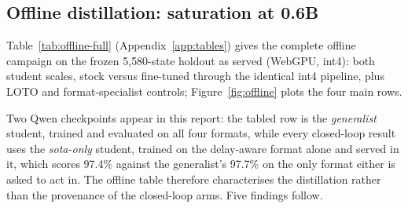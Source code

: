 \subsection{Offline distillation: saturation at 0.6B}\label{sec:res-offline}
Table~\ref{tab:offline-full} (Appendix~\ref{app:tables}) gives the complete
offline campaign on the frozen 5{,}580-state holdout as served (WebGPU,
int4): both student scales, stock versus fine-tuned through the identical
int4 pipeline, plus LOTO and format-specialist controls;
Figure~\ref{fig:offline} plots the four main rows.



Two Qwen checkpoints appear in this report: the tabled row is the
\emph{generalist} student, trained and evaluated on all four formats,
while every closed-loop result uses the \emph{sota-only} student, trained
on the delay-aware format alone and served in it, which scores 97.4\%
against the generalist's 97.7\% on the only format either is asked to act
in. The offline table therefore characterises the distillation rather than
the provenance of the closed-loop arms. Five findings follow.

